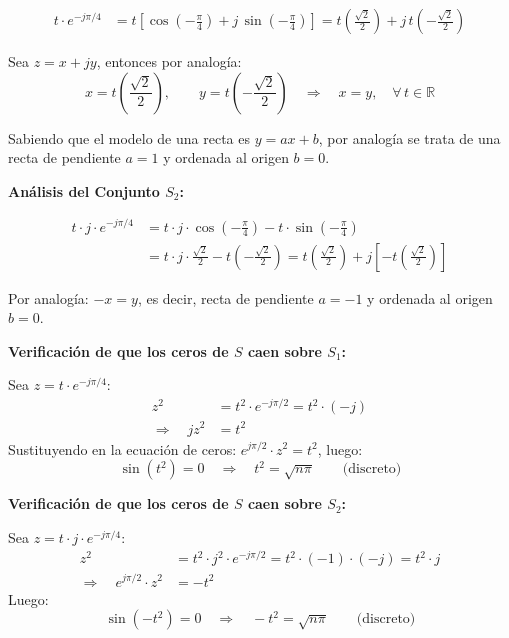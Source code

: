 \documentclass[12pt,a4paper]{article}
\begin{document}
\begin{align*}
    t \cdot e^{-j\pi/4}
    &= t\left[\cos\!\left(-\tfrac{\pi}{4}\right) + j\,\sin\!\left(-\tfrac{\pi}{4}\right)\right]
     = t\left(\frac{\sqrt{2}}{2}\right) + j\, t\left(-\frac{\sqrt{2}}{2}\right)
\end{align*}
 
Sea $z = x + jy$, entonces por analogía:
\[
    x = t\!\left(\frac{\sqrt{2}}{2}\right), \qquad y = t\!\left(-\frac{\sqrt{2}}{2}\right)
    \quad \Rightarrow \quad x = y, \quad \forall\, t \in \mathbb{R}
\]
 
Sabiendo que el modelo de una recta es $y = ax + b$, por analogía se trata de una recta
de pendiente $a = 1$ y ordenada al origen $b = 0$.
 
\medskip
\textbf{Análisis del Conjunto $S_2$:}
 
\begin{align*}
    t \cdot j \cdot e^{-j\pi/4}
    &= t \cdot j \cdot \cos\!\left(-\tfrac{\pi}{4}\right) - t \cdot \sin\!\left(-\tfrac{\pi}{4}\right) \\
    &= t \cdot j \cdot \frac{\sqrt{2}}{2} - t\!\left(-\frac{\sqrt{2}}{2}\right)
     = t\!\left(\frac{\sqrt{2}}{2}\right) + j\left[-t\!\left(\frac{\sqrt{2}}{2}\right)\right]
\end{align*}
 
Por analogía: $-x = y$, es decir, recta de pendiente $a = -1$ y ordenada al origen $b = 0$.
 
\bigskip
\textbf{Verificación de que los ceros de $S$ caen sobre $S_1$:}
 
Sea $z = t \cdot e^{-j\pi/4}$:
\begin{align*}
    z^2 &= t^2 \cdot e^{-j\pi/2} = t^2 \cdot (-j) \\
    \Rightarrow \quad j z^2 &= t^2
\end{align*}
Sustituyendo en la ecuación de ceros: $e^{j\pi/2} \cdot z^2 = t^2$, luego:
\[
    \sin(t^2) = 0 \quad \Rightarrow \quad t^2 = \sqrt{n\pi} \qquad \text{(discreto)}
\]
 
\textbf{Verificación de que los ceros de $S$ caen sobre $S_2$:}
 
Sea $z = t \cdot j \cdot e^{-j\pi/4}$:
\begin{align*}
    z^2 &= t^2 \cdot j^2 \cdot e^{-j\pi/2} = t^2 \cdot (-1) \cdot (-j) = t^2 \cdot j \\
    \Rightarrow \quad e^{j\pi/2} \cdot z^2 &= -t^2
\end{align*}
Luego:
\[
    \sin(-t^2) = 0 \quad \Rightarrow \quad -t^2 = \sqrt{n\pi} \qquad \text{(discreto)}
\]
\end{document}
